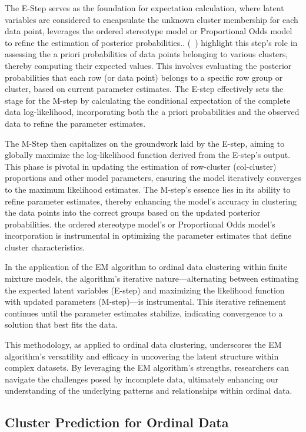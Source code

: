 \documentclass{article}
\begin{document}
The E-Step serves as the foundation for expectation calculation, where latent variables are considered to encapsulate the unknown cluster membership for each data point, leverages the ordered stereotype model or Proportional Odds model to refine the estimation of posterior probabilities.. (~\cite{fernandez2016mixture}) highlight this step's role in assessing the a priori probabilities of data points belonging to various clusters, thereby computing their expected values. This involves evaluating the posterior probabilities that each row (or data point) belongs to a specific row group or cluster, based on current parameter estimates. The E-step effectively sets the stage for the M-step by calculating the conditional expectation of the complete data log-likelihood, incorporating both the a priori probabilities and the observed data to refine the parameter estimates.

The M-Step then capitalizes on the groundwork laid by the E-step, aiming to globally maximize the log-likelihood function derived from the E-step's output. 
This phase is pivotal in updating the estimation of row-cluster (col-cluster) proportions and other model parameters, ensuring the model iteratively converges to the maximum likelihood estimates. 
The M-step's essence lies in its ability to refine parameter estimates, thereby enhancing the model's accuracy in clustering the data points into the correct groups based on the updated posterior probabilities.
the ordered stereotype model's or Proportional Odds model's incorporation is instrumental in optimizing the parameter estimates that define cluster characteristics. 

In the application of the EM algorithm to ordinal data clustering within finite mixture models, the algorithm's iterative nature—alternating between estimating the expected latent variables (E-step) and maximizing the likelihood function with updated parameters (M-step)—is instrumental. This iterative refinement continues until the parameter estimates stabilize, indicating convergence to a solution that best fits the data.

This methodology, as applied to ordinal data clustering, underscores the EM algorithm's versatility and efficacy in uncovering the latent structure within complex datasets. By leveraging the EM algorithm's strengths, researchers can navigate the challenges posed by incomplete data, ultimately enhancing our understanding of the underlying patterns and relationships within ordinal data.

\subsection{Cluster Prediction for Ordinal Data}
\end{document}
